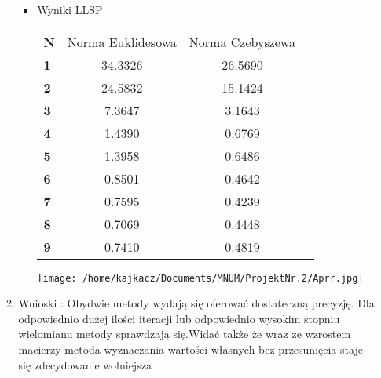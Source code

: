 \documentclass[a4paper, 11pt]{article}
\begin{document}
\begin{enumerate}
\begin{enumerate}
\begin{itemize}
\item Wyniki LLSP
\begin{center}
\begin{tabular}{ l*{2}{c}r}
  \hline	
  \bfseries N & Norma Euklidesowa & Norma Czebyszewa\\
  \bfseries 1 & 34.3326 & 26.5690 \\
  \bfseries 2 & 24.5832 & 15.1424 \\
  \bfseries 3 & 7.3647 & 3.1643 \\
    \bfseries 4 & 1.4390 & 0.6769 \\
      \bfseries 5 & 1.3958 & 0.6486 \\
        \bfseries 6 & 0.8501 & 0.4642 \\
        \bfseries 7 & 0.7595 & 0.4239 \\
  \bfseries 8 & 0.7069 & 0.4448 \\
  \bfseries 9 & 0.7410 & 0.4819 \\

  \hline  
\end{tabular}
\end{center}
\bigskip

\texttt{[image: /home/kajkacz/Documents/MNUM/ProjektNr.2/Aprr.jpg]}

\end{itemize}
\item Wnioski : Obydwie metody wydają się oferować dostateczną precyzję. Dla odpowiednio dużej ilości iteracji lub odpowiednio wysokim stopniu wielomianu metody sprawdzają się.Widać także że wraz ze wzrostem macierzy metoda wyznaczania wartości własnych bez przesunięcia staje się zdecydowanie wolniejsza

\end{enumerate}
\end{enumerate}
\end{document}
